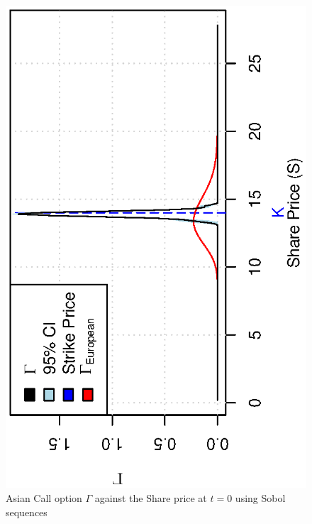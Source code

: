 \documentclass[12pt,a4paper]{article}
\begin{document}
\begin{figure}[!ht]
  \centering
  \includegraphics[scale=0.85,angle=-90]{./images/sobol/gamma_share.eps}
  \caption{Asian Call option $\Gamma$ against the Share price at $t=0$
  using Sobol sequences}
  \label{fig:gamma-share-sobol}
\end{figure}
\end{document}
